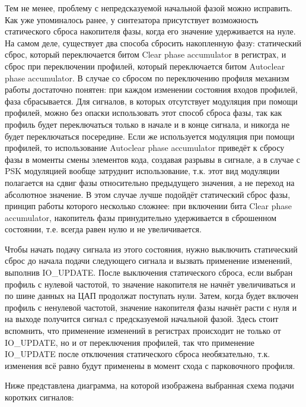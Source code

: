 \documentclass[rusmathsym, eqnumwithinsec, amspack, hyperref]{bomgost}
\begin{document}
Тем не менее, проблему с непредсказуемой начальной фазой можно исправить. Как уже упоминалось ранее, у синтезатора присутствует возможность статического сброса накопителя фазы, когда его значение удерживается на нуле. На самом деле, существует два способа сбросить накопленную фазу: статический сброс, который переключается битом \textenglish{Clear phase accumulator} в регистрах, и сброс при переключении профилей, который переключается битом Autoclear phase accumulator. В случае со сбросом по переключению профиля механизм работы достаточно понятен: при каждом изменении состояния входов профилей, фаза сбрасывается. Для сигналов, в которых отсутствует модуляция при помощи профилей, можно без опаски использовать этот способ сброса фазы, так как профиль будет переключаться только в начале и в конце сигнала, и никогда не будет переключаться посередине. Если же используется модуляция при помощи профилей, то использование Autoclear phase accumulator приведёт к сбросу фазы в моменты смены элементов кода, создавая разрывы в сигнале, а в случае с PSK модуляцией вообще затруднит использование, т.к. этот вид модуляции полагается на сдвиг фазы относительно предыдущего значения, а не переход на абсолютное значение. В этом случае лучше подойдёт статический сброс фазы, принцип работы которого несколько сложнее: при включении бита Clear phase accumulator, накопитель фазы принудительно удерживается в сброшенном состоянии, т.е. всегда равен нулю и не увеличивается.

Чтобы начать подачу сигнала из этого состояния, нужно выключить статический сброс до начала подачи следующего сигнала и вызвать применение изменений, выполнив IO\_UPDATE. После выключения статического сброса, если выбран профиль с нулевой частотой, то значение накопителя не начнёт увеличиваться и по шине данных на ЦАП продолжат поступать нули. Затем, когда будет включен профиль с ненулевой частотой, значение накопителя фазы начнёт расти с нуля и на выходе получится сигнал с предсказуемой начальной фазой. Здесь стоит вспомнить, что применение изменений в регистрах происходит не только от IO\_UPDATE, но и от переключения профилей, так что применение IO\_UPDATE после отключения статического сброса необязательно, т.к. изменения всё равно будут применены в момент схода с парковочного профиля.

Ниже представлена диаграмма, на которой изображена выбранная схема подачи коротких сигналов:
\end{document}
